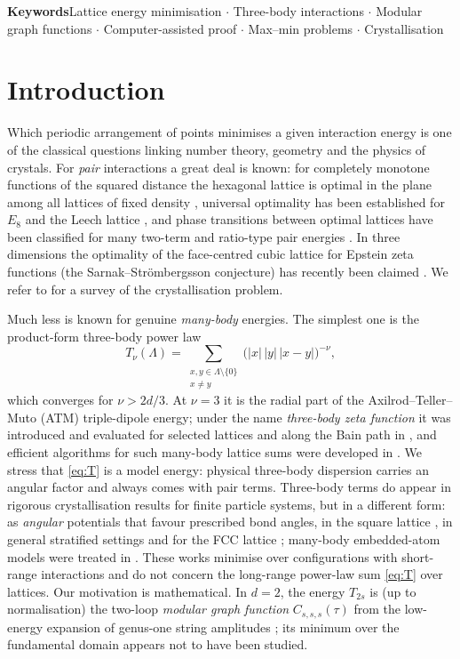 \documentclass[10pt,twocolumn,a4paper]{article}
\theoremstyle{definition}
\begin{document}
\medskip
\noindent\textbf{Keywords}\enspace Lattice energy minimisation $\cdot$ Three-body interactions $\cdot$ Modular graph functions $\cdot$ Computer-assisted proof $\cdot$ Max--min problems $\cdot$ Crystallisation

\section{Introduction}
Which periodic arrangement of points minimises a given interaction energy is one of the classical questions linking number theory, geometry and the physics of crystals. For \emph{pair} interactions a great deal is known: for completely monotone functions of the squared distance the hexagonal lattice is optimal in the plane among all lattices of fixed density \cite{Rankin,Cassels,Ennola,Diananda,Montgomery}, universal optimality has been established for $E_8$ and the Leech lattice \cite{CKMRV}, and phase transitions between optimal lattices have been classified for many two-term and ratio-type pair energies \cite{BST,Betermin2D,LuoWei}. In three dimensions the optimality of the face-centred cubic lattice for Epstein zeta functions (the Sarnak--Str\"ombergsson conjecture) has recently been claimed \cite{LuoWeiFCC}. We refer to \cite{BlancLewin} for a survey of the crystallisation problem.

Much less is known for genuine \emph{many-body} energies. The simplest one is the product-form three-body power law
\begin{equation}\label{eq:T}
T_\nu(\Lambda)=\sum_{\substack{x,y\in\Lambda\setminus\{0\}\\ x\neq y}}\bigl(|x|\,|y|\,|x-y|\bigr)^{-\nu},
\end{equation}
which converges for $\nu>2d/3$. At $\nu=3$ it is the radial part of the Axilrod--Teller--Muto (ATM) triple-dipole energy; under the name \emph{three-body zeta function} it was introduced and evaluated for selected lattices and along the Bain path in \cite{RoblesNavarro}, and efficient algorithms for such many-body lattice sums were developed in \cite{BuchheitBusse,BuchheitRupp}. We stress that \eqref{eq:T} is a model energy: physical three-body dispersion carries an angular factor and always comes with pair terms. Three-body terms do appear in rigorous crystallisation results for finite particle systems, but in a different form: as \emph{angular} potentials that favour prescribed bond angles, in the square lattice \cite{MPS,FK1903}, in general stratified settings \cite{FK2209,FKS2509} and for the FCC lattice \cite{FlatleyTheil}; many-body embedded-atom models were treated in \cite{BFS}. These works minimise over configurations with short-range interactions and do not concern the long-range power-law sum \eqref{eq:T} over lattices. Our motivation is mathematical. In $d=2$, the energy $T_{2s}$ is (up to normalisation) the two-loop \emph{modular graph function} $C_{s,s,s}(\tau)$ from the low-energy expansion of genus-one string amplitudes \cite{DGV}; its minimum over the fundamental domain appears not to have been studied.
\end{document}
